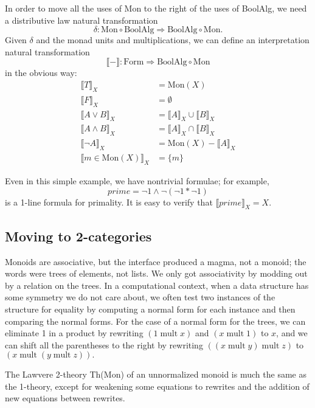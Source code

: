 \documentclass{article}
\newcommand{\interp}[1]{\llbracket #1 \rrbracket}
\newcommand{\maps}{\colon}
\newcommand{\Mon}{\mathrm{Mon}}
\newcommand{\BoolAlg}{\mathrm{BoolAlg}}
\newcommand{\Form}{\mathrm{Form}}
\newcommand{\mult}{\mathop{\mathrm{mult}}}
\begin{document}
In order to move all the uses of Mon to the right of the uses of BoolAlg, we need a distributive law natural transformation
\[ \delta\maps \Mon \circ \BoolAlg \Rightarrow \BoolAlg \circ \Mon. \]
Given $\delta$ and the monad units and multiplications, we can define an interpretation natural transformation
\[ \interp{-}\maps \Form\Rightarrow \BoolAlg \circ \Mon \]
in the obvious way:
\begin{align*}
  \interp{T}_X &= \Mon(X)\\
  \interp{F}_X &= \emptyset\\
  \interp{{A}\lor{B}}_X &= \interp{A}_X \cup \interp{B}_X\\
  \interp{{A}\land{B}}_X &= \interp{A}_X \cap \interp{B}_X\\
  \interp{\neg A}_X &= \Mon(X) - \interp{A}_X\\
  \interp{m \in \Mon(X)}_X &= \{m\}
\end{align*}

Even in this simple example, we have nontrivial formulae; for example,
\[ prime = \neg 1 \land \neg(\neg 1 * \neg 1) \]
is a 1-line formula for primality.  It is easy to verify that $\interp{prime}_X = X.$

\subsection{Moving to 2-categories}

Monoids are associative, but the interface produced a magma, not a monoid; the words were trees of elements, not lists.  We only got associativity by modding out by a relation on the trees.  In a computational context, when a data structure has some symmetry we do not care about, we often test two instances of the structure for equality by computing a normal form for each instance and then comparing the normal forms.  For the case of a normal form for the trees, we can eliminate 1 in a product by rewriting $(1 \mult x)$ and $(x \mult 1)$ to $x$, and we can shift all the parentheses to the right by rewriting $((x \mult y) \mult z)$ to $(x \mult (y \mult z)).$

The Lawvere 2-theory Th(Mon) of an unnormalized monoid is much the same as the 1-theory, except for weakening some equations to rewrites and the addition of new equations between rewrites.
\end{document}
